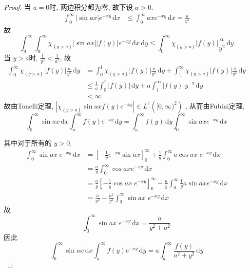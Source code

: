 \documentclass[../main.tex]{subfiles}
\begin{document}
\begin{proof}
当 \(  a= 0  \)时, 两边积分都为零, 故下设 \(  a> 0  \).  
\[
\begin{aligned}
\int_{0}^{\infty}\left| \sin ax \right|e^{-xy}\,\mathrm{d} x&\le \int_{0}^{\infty}axe^{-xy}\,\mathrm{d} x= \frac{a }{y^{2} } 
\end{aligned}   
\]故 \[
\int_{0}^{\infty}\int_{0}^{\infty}\chi _{\left\{ y> a \right\}}\left| \sin ax \right|\left| f\left( y \right)  \right|e^{-xy}\,\mathrm{d} x\,\mathrm{d} y\le \int_{0}^{\infty}\chi _{\left\{ y> a \right\}}  \left| f\left( y \right)  \right|\frac{a }{y^{2} }  \,\mathrm{d} y
\]当 \(  y>  a  \)时, \(  \frac{1 }{y^{2} }< \frac{1 }{a^{2} }    \), 故  \[
\begin{aligned}
\int_{0}^{\infty}\chi _{\left\{ y> a \right\}}\left| f\left( y \right)  \right|\frac{a }{y^{2} }\,\mathrm{d} y&= \int_{0}^{1}\chi _{\left\{ y> a \right\}}\left| f\left( y \right)  \right|\frac{a }{y^{2} }\,\mathrm{d} y+ \int_{1}^{\infty}\chi _{\left\{ y> a \right\}}    \left| f\left( y \right)  \right|\frac{a }{y^{2} }\,\mathrm{d} y \\ 
 &\le \frac{1 }{a }\int_{0}^{1}\left| f\left( y \right)  \right|\,\mathrm{d} y+  a\int_{1}^{\infty}\left| f\left( y \right)  \right|y^{-2}   \,\mathrm{d} y\\ 
  &< \infty
\end{aligned}  
\]故由Tonelli定理,  \(  \left| \chi _{\left\{ y> a \right\}}\sin ax f\left( y \right)e^{-xy}  \right|\in L^{1}\left( [0,\infty)^{2} \right)    \) , 从而由Fubini定理, \[
\int_{0}^{\infty}\sin ax \,\mathrm{d} x\int_{a}^{\infty}f\left( y \right)e^{-xy}\,\mathrm{d} y= \int_{a}^{\infty}f\left( y \right)\,\mathrm{d} y \int_{0}^{\infty}\sin ax e^{-xy}\,\mathrm{d} x 
\]

其中对于所有的 \(  y> 0  \),   \[
  \begin{aligned}
  \int_{0}^{\infty}\sin ax  \;e^{-xy}\,\mathrm{d} x&= [-\frac{1 }{y }  e^{-xy}\sin  ax ]_{0}^{\infty}+ \frac{1 }{y } \int_{0}^{\infty}a\cos ax \; e^{-xy}\,\mathrm{d} x  \\ 
   &= \frac{a }{y }\int_{0}^{\infty}\cos axe^{-xy}\,\mathrm{d} x  \\ 
    &=   \frac{a }{y }[-\frac{1 }{y } \cos  ax\; e^{-xy} ]_{0}^{\infty} - \frac{a }{y }\int_{0}^{\infty}\frac{1 }{y }a\sin ax e^{-xy}\,\mathrm{d} x  \\ 
     &= \frac{a}{y^{2} }-\frac{a^{2} }{y^{2} } \int_{0}^{\infty}\sin ax\;e^{-xy}\,\mathrm{d} x  
  \end{aligned}
  \]故 \[
\int_{0}^{\infty}\sin ax\;e^{-xy}\,\mathrm{d} x= \frac{a }{y^{2}+ a^{2} } 
  \]因此 \[
  \int_{0}^{\infty}\sin ax \,\mathrm{d} x\int_{a}^{\infty}f\left( y \right)e^{-xy}\,\mathrm{d} y=a \int_{a}^{\infty}\frac{f\left( y \right)  }{a^{2}+ y^{2} }\,\mathrm{d} y  
  \]
\end{proof}
\end{document}
